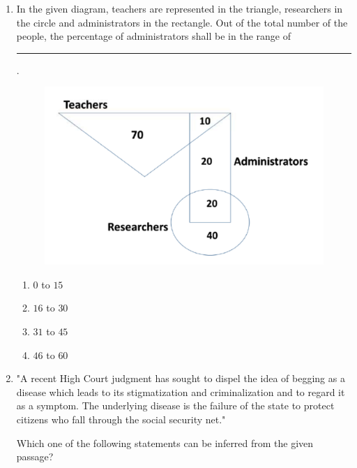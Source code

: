 \documentclass[journal,12pt,onecolumn]{IEEEtran}
\theoremstyle{remark}
\begin{document}
\begin{enumerate}
\hfill{}
\begin{multicols}{4}
    \begin{enumerate}
        \item P
        \item R
        \item S
        \item Q
    \end{enumerate}
\end{multicols}

    \item In the given diagram, teachers are represented in the triangle, researchers in the circle and administrators in the rectangle. Out of the total number of the people, the percentage of administrators shall be in the range of \rule{1cm}{0.1mm} .
    
\hfill{}
\begin{figure}[H]
    \centering
	\includegraphics[width=0.5\columnwidth]{Fig/7i.png}
    \caption{}
    \label{fig:7i}
\end{figure}

\begin{multicols}{4}
    \begin{enumerate}
        \item $0$ to $15$
        \item $16$ to $30$
        \item $31$ to $45$
        \item $46$ to $60$
    \end{enumerate}
\end{multicols}

    \item "A recent High Court judgment has sought to dispel the idea of begging as a disease which leads to its stigmatization and criminalization and to regard it as a symptom. The underlying disease is the failure of the state to protect citizens who fall through the social security net."

Which one of the following statements can be inferred from the given passage?


\end{enumerate}
\end{document}
